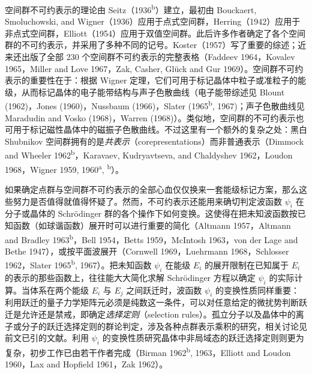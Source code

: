 空间群不可约表示的理论由 Seitz（1936\textsuperscript{b}）建立，最初由 Bouckaert, Smoluchowski, and Wigner（1936）应用于点式空间群，Herring（1942）应用于非点式空间群，Elliott（1954）应用于双值空间群。此后许多作者确定了各个空间群的不可约表示，并采用了多种不同的记号。Koster（1957）写了重要的综述；近来还出版了全部 230 个空间群不可约表示的完整表格（Faddeev 1964，Kovalev 1965，Miller and Love 1967，Zak, Casher, Glück and Gur 1969）。空间群不可约表示的重要性在于：根据 Wigner 定理，它们可用于标记晶体中粒子或准粒子的能级，从而标记晶体的电子能带结构与声子色散曲线（电子能带综述见 Blount (1962)，Jones (1960)，Nussbaum (1966)，Slater (1965\textsuperscript{b}, 1967)；声子色散曲线见 Maradudin and Vosko (1968)，Warren (1968)）。类似地，空间群的不可约表示也可用于标记磁性晶体中的磁振子色散曲线。不过这里有一个额外的复杂之处：黑白 Shubnikov 空间群拥有的是\textit{共表示}（corepresentations）而非普通表示（Dimmock and Wheeler 1962\textsuperscript{b}，Karavaev, Kudryavtseva, and Chaldyshev 1962，Loudon 1968，Wigner 1959, 1960\textsuperscript{a}, \textsuperscript{b}）。

如果确定点群与空间群不可约表示的全部心血仅仅换来一套能级标记方案，那么这些努力是否值得就值得怀疑了。然而，不可约表示还能用来确切判定波函数 $\psi_{i}$ 在分子或晶体的 Schrödinger 群的各个操作下如何变换。这使得在把未知波函数按已知函数（如球谐函数）展开时可以进行重要的简化（Altmann 1957，Altmann and Bradley 1963\textsuperscript{b}，Bell 1954，Betts 1959，McIntosh 1963，von der Lage and Bethe 1947），或按平面波展开（Cornwell 1969，Luehrmann 1968，Schlosser 1962，Slater 1965\textsuperscript{b}, 1967）。把未知函数 $\psi_{i}$ 在能级 $E_{i}$ 的展开限制在已知属于 $E_{i}$ 的表示的那些函数上，往往能大大简化求解 Schrödinger 方程以确定 $\psi_{i}$ 的实际计算。当体系在两个能级 $E_{i}$ 与 $E_{j}$ 之间跃迁时，波函数 $\psi_{i}$ 的变换性质同样重要：利用跃迁的量子力学矩阵元必须是纯数这一条件，可以对任意给定的微扰势判断跃迁是允许还是禁戒，即确定\textit{选择定则}（selection rules）。孤立分子以及晶体中的离子或分子的跃迁选择定则的群论判定，涉及各种点群表示乘积的研究，相关讨论见前文已引的文献。利用 $\psi_{i}$ 的变换性质研究晶体中非局域态的跃迁选择定则则更为复杂，初步工作已由若干作者完成（Birman 1962\textsuperscript{b}, 1963，Elliott and Loudon 1960，Lax and Hopfield 1961，Zak 1962）。
